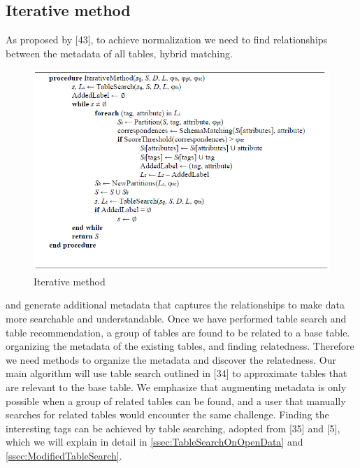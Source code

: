 \subsection{Iterative method}
\label{ssec:IterativeMethod}

As proposed by \cite{Smith2011Unity}[43], to achieve normalization we need to find relationships between the metadata of all tables, hybrid matching.

\begin{figure}
    \centering
    \includegraphics[width=5in]{figures/iterative-method.png}
    \caption{Iterative method}
    \label{fig:iterative-method}
\end{figure}

and generate additional metadata that captures the relationships to make data more searchable and understandable.
Once we have performed table search and table recommendation, a group of tables are found to be related to a base table.
organizing the metadata of the existing tables, and finding relatedness.
Therefore we need methods to organize the metadata and discover the relatedness.
Our main algorithm will use table search outlined in \cite{Mudgal2018Deep}[34] to approximate tables that are relevant to the base table.
We emphasize that augmenting metadata is only possible when a group of related tables can be found, and a user that manually searches for related tables would encounter the same challenge.
Finding the interesting tags can be achieved by table searching, adopted from \cite{Nargesian2018Table}[35] and \cite{conf/esws/EllefiBDT16}[5], which we will explain in detail in \autoref{ssec:TableSearchOnOpenData} and \autoref{ssec:ModifiedTableSearch}.

